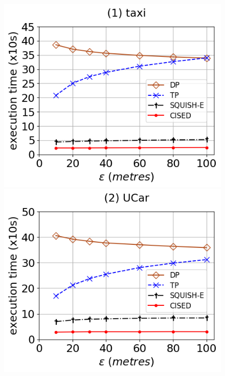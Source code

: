 \begin{figure}[tb!]
	\centering
	\includegraphics[scale=0.315]{Figures/Exp-SED-time-epsilon-taxi.png}	\hspace{1ex}
	\includegraphics[scale=0.315]{Figures/Exp-SED-time-epsilon-service.png}	\hspace{1ex}

\end{figure}
